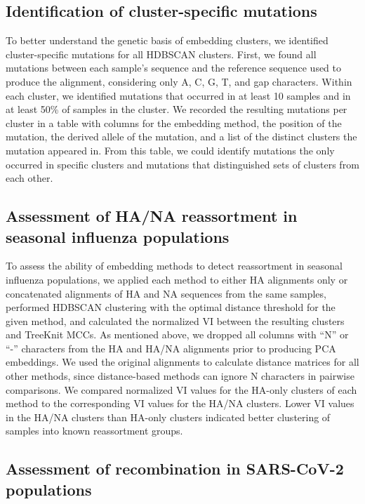 \documentclass[webpdf,contemporary,large,single]{oup-authoring-template}%
\theoremstyle{thmstyleone}%
\theoremstyle{thmstyletwo}%
\theoremstyle{thmstylethree}%
\begin{document}
\subsection{Identification of cluster-specific mutations}

To better understand the genetic basis of embedding clusters, we identified cluster-specific mutations for all HDBSCAN clusters.
First, we found all mutations between each sample's sequence and the reference sequence used to produce the alignment, considering only A, C, G, T, and gap characters.
Within each cluster, we identified mutations that occurred in at least 10 samples and in at least 50\% of samples in the cluster.
We recorded the resulting mutations per cluster in a table with columns for the embedding method, the position of the mutation, the derived allele of the mutation, and a list of the distinct clusters the mutation appeared in.
From this table, we could identify mutations the only occurred in specific clusters and mutations that distinguished sets of clusters from each other.

\subsection{Assessment of HA/NA reassortment in seasonal influenza populations}

To assess the ability of embedding methods to detect reassortment in seasonal influenza populations, we applied each method to either HA alignments only or concatenated alignments of HA and NA sequences from the same samples, performed HDBSCAN clustering with the optimal distance threshold for the given method, and calculated the normalized VI between the resulting clusters and TreeKnit MCCs.
As mentioned above, we dropped all columns with ``N'' or ``-'' characters from the HA and HA/NA alignments prior to producing PCA embeddings.
We used the original alignments to calculate distance matrices for all other methods, since distance-based methods can ignore N characters in pairwise comparisons.
We compared normalized VI values for the HA-only clusters of each method to the corresponding VI values for the HA/NA clusters.
Lower VI values in the HA/NA clusters than HA-only clusters indicated better clustering of samples into known reassortment groups.

\subsection{Assessment of recombination in SARS-CoV-2 populations}
\end{document}
